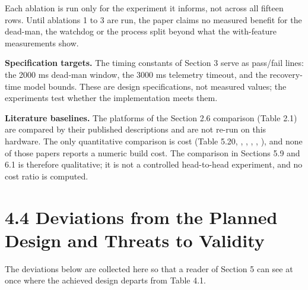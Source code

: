 Each ablation is run only for the experiment it informs, not across all fifteen rows. Until ablations 1 to 3 are run, the paper claims no measured benefit for the dead-man, the watchdog or the process split beyond what the with-feature measurements show.

\textbf{Specification targets.} The timing constants of Section 3 serve as pass/fail lines: the 2000 ms dead-man window, the 3000 ms telemetry timeout, and the recovery-time model bounds. These are design specifications, not measured values; the experiments test whether the implementation meets them.

\textbf{Literature baselines.} The platforms of the Section 2.6 comparison (Table 2.1) are compared by their published descriptions and are not re-run on this hardware. The only quantitative comparison is cost (Table 5.20, \cite{verano2022}, \cite{megalingam2022}, \cite{casper2003}, \cite{daun2023}, \cite{liu2013}), and none of those papers reports a numeric build cost. The comparison in Sections 5.9 and 6.1 is therefore qualitative; it is not a controlled head-to-head experiment, and no cost ratio is computed.

\section*{4.4 Deviations from the Planned Design and Threats to Validity}

The deviations below are collected here so that a reader of Section 5 can see at once where the achieved design departs from Table 4.1.

